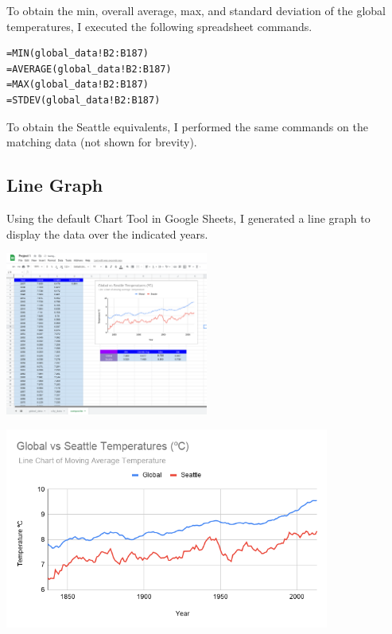 \documentclass[12pt]{article}
\begin{document}
To obtain the min, overall average, max, and standard deviation of the global temperatures, I executed the following spreadsheet commands.

\begin{verbatim}
=MIN(global_data!B2:B187)
=AVERAGE(global_data!B2:B187)
=MAX(global_data!B2:B187)
=STDEV(global_data!B2:B187)
\end{verbatim}

To obtain the Seattle equivalents, I performed the same commands on the matching data (not shown for brevity).

\pagebreak

\subsection{Line Graph}
Using the default Chart Tool in Google Sheets, I generated a line graph to display the data over the indicated years.

\begin{center}
\includegraphics[width=0.5\textwidth]{composite.png}
\end{center}

\begin{center}
\includegraphics[width=0.8\textwidth]{line_graph.png}
\end{center}

\pagebreak
\end{document}
